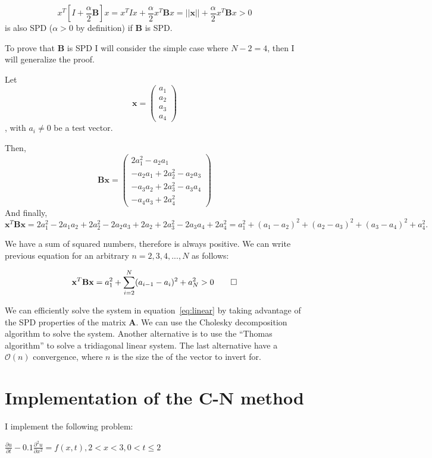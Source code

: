 \documentclass[10pt]{article}
\begin{document}
\[
x^T \left[I  +\frac{\alpha}{2}\mathbf{B} \right] x = %
x^T I x  +\frac{\alpha}{2} x^T \mathbf{B} x = ||\mathbf{x}|| +\frac{\alpha}{2} x^T \mathbf{B} x  > 0 
\]
is also SPD ($\alpha>0$ by definition) if $\mathbf{B}$ is SPD.

To prove that $\mathbf{B}$ is SPD I will consider the simple case where $N-2=4$, 
 then I will generalize the proof.

Let
\[
\mathbf{x}=
 \begin{pmatrix}
  a_1 \\
  a_2 \\
  a_3 \\
  a_4 
 \end{pmatrix}
\], with $a_i \neq 0$ be a test vector.

Then,
\[
\mathbf{B}\mathbf{x}=
 \begin{pmatrix}
  2a_1^2-a_2a_1 \\
  -a_2a_1+2a_2^2-a_2a_3 \\
  -a_3a_2+2a_3^2-a_3a_4 \\
  -a_4a_3+2a_4^2 
 \end{pmatrix}
\]
And finally,
\[
\mathbf{x}^T\mathbf{B}\mathbf{x} = 2a_1^2 -2a_1a_2 +2a_2^2 -2a_2a_3+2a_2 +2a_3^2-2a_3a_4+2a_4^2 = %
 a_1^2 +(a_1-a_2)^2 + (a_2-a_3)^2+(a_3-a_4)^2+a_4^2 .
\]

We have a sum of squared numbers, therefore is always positive. We can write previous
equation for an arbitrary $n=2,3,4,...,N$ as follows:

\begin{equation}
\mathbf{x}^T\mathbf{B}\mathbf{x} = a_1^2 +{\sum_{i=2}^{N} (a_{i-1} -a_i)^2}  +a_N^2 >0 \qed
\label{eq:Bspd}
\end{equation}

We can efficiently solve the system in equation~\ref{eq:linear} by taking 
advantage of the SPD properties of the matrix $\mathbf{A}$. We
can use the Cholesky decomposition algorithm to solve the system.
Another alternative is to use the ``Thomas algorithm''\cite{thomas} to solve a tridiagonal
linear system. The last alternative have a $\mathcal{O}(n)$ convergence, where $n$ is the
size the of the vector to invert for. 

\section{Implementation of the C-N method}
I implement the following problem:

$\frac{\partial u}{\partial t} -0.1\frac{\partial^2 u}{\partial x^2} = f(x,t),  2<x<3, 0<t\leq2$
\end{document}
